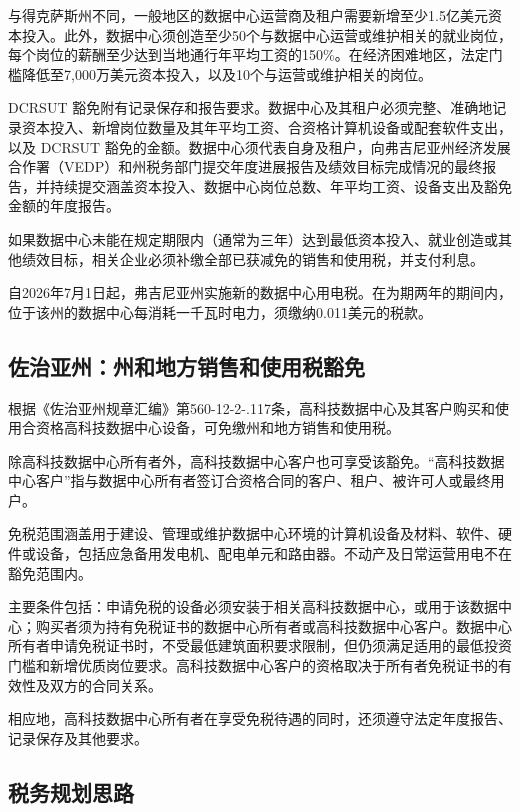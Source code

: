 与得克萨斯州不同，一般地区的数据中心运营商及租户需要新增至少1.5亿美元资本投入。此外，数据中心须创造至少50个与数据中心运营或维护相关的就业岗位，每个岗位的薪酬至少达到当地通行年平均工资的150\%。在经济困难地区，法定门槛降低至7,000万美元资本投入，以及10个与运营或维护相关的岗位。


DCRSUT 豁免附有记录保存和报告要求。数据中心及其租户必须完整、准确地记录资本投入、新增岗位数量及其年平均工资、合资格计算机设备或配套软件支出，以及 DCRSUT 豁免的金额。数据中心须代表自身及租户，向弗吉尼亚州经济发展合作署（VEDP）和州税务部门提交年度进展报告及绩效目标完成情况的最终报告，并持续提交涵盖资本投入、数据中心岗位总数、年平均工资、设备支出及豁免金额的年度报告。

如果数据中心未能在规定期限内（通常为三年）达到最低资本投入、就业创造或其他绩效目标，相关企业必须补缴全部已获减免的销售和使用税，并支付利息。

自2026年7月1日起，弗吉尼亚州实施新的数据中心用电税。在为期两年的期间内，位于该州的数据中心每消耗一千瓦时电力，须缴纳0.011美元的税款。

\subsection{佐治亚州：州和地方销售和使用税豁免}

根据《佐治亚州规章汇编》第560-12-2-.117条，高科技数据中心及其客户购买和使用合资格高科技数据中心设备，可免缴州和地方销售和使用税。

除高科技数据中心所有者外，高科技数据中心客户也可享受该豁免。“高科技数据中心客户”指与数据中心所有者签订合资格合同的客户、租户、被许可人或最终用户。

免税范围涵盖用于建设、管理或维护数据中心环境的计算机设备及材料、软件、硬件或设备，包括应急备用发电机、配电单元和路由器。不动产及日常运营用电不在豁免范围内。

主要条件包括：申请免税的设备必须安装于相关高科技数据中心，或用于该数据中心；购买者须为持有免税证书的数据中心所有者或高科技数据中心客户。数据中心所有者申请免税证书时，不受最低建筑面积要求限制，但仍须满足适用的最低投资门槛和新增优质岗位要求。高科技数据中心客户的资格取决于所有者免税证书的有效性及双方的合同关系。



相应地，高科技数据中心所有者在享受免税待遇的同时，还须遵守法定年度报告、记录保存及其他要求。

\subsection{税务规划思路}

